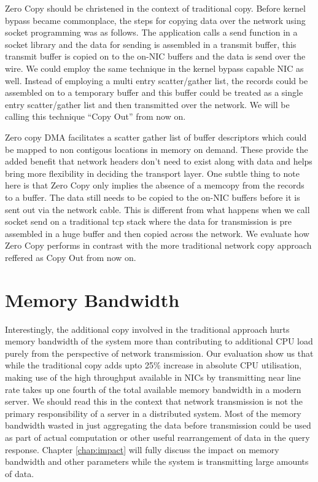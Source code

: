 Zero Copy should be christened in the context of traditional copy. Before kernel bypass became 
commonplace, the steps for copying data over the network using socket programming was as follows. 
The application calls a send function in a socket library and the data for sending is assembled 
in a transmit buffer, this transmit buffer is copied on to the on-NIC buffers and the data is 
send over the wire. We could employ the same technique in the kernel bypass capable NIC as well.
Instead of employing a multi entry scatter/gather list, the records could be assembled on 
to a temporary buffer and this buffer could be treated as a single entry scatter/gather list
and then transmitted over the network. We will be calling this technique \enquote{Copy Out} from now on.


Zero copy DMA facilitates a scatter gather list of buffer descriptors
which could be mapped to non contigous locations in memory on demand. These provide
the added benefit that network headers don't need to exist along with data and helps bring more flexibility 
in deciding the transport layer. One subtle thing to note here is that Zero Copy only implies the absence 
of a memcopy from the records to a buffer. The data still needs to be copied to the on-NIC buffers before 
it is sent out via the network cable. This is different from what happens when we call socket send on a traditional 
tcp stack where the data for transmission is pre assembled in a huge buffer and then copied across the network.
We evaluate how Zero Copy performs in contrast with the more traditional network copy approach reffered
 as Copy Out from now on.

\section{Memory Bandwidth}
Interestingly, the additional copy involved in the traditional approach hurts memory bandwidth of the system more than contributing 
to additional CPU load purely from the perspective of network transmission. Our evaluation show us that while the traditional
copy adds upto 25\% increase in absolute CPU utilisation, making use of the high throughput available in NICs by transmitting
near line rate takes up one fourth of the total available memory bandwidth in a modern server. We should read this in the context that 
network transmission is not the primary responsibility of a server in a distributed system. Most of the memory bandwidth wasted in 
just aggregating the data before transmission could be used as part of actual computation or other useful rearrangement of data in 
the query response. Chapter \ref{chap:impact} will fully discuss the impact on memory bandwidth and other parameters while the system 
is transmitting large amounts of data.


